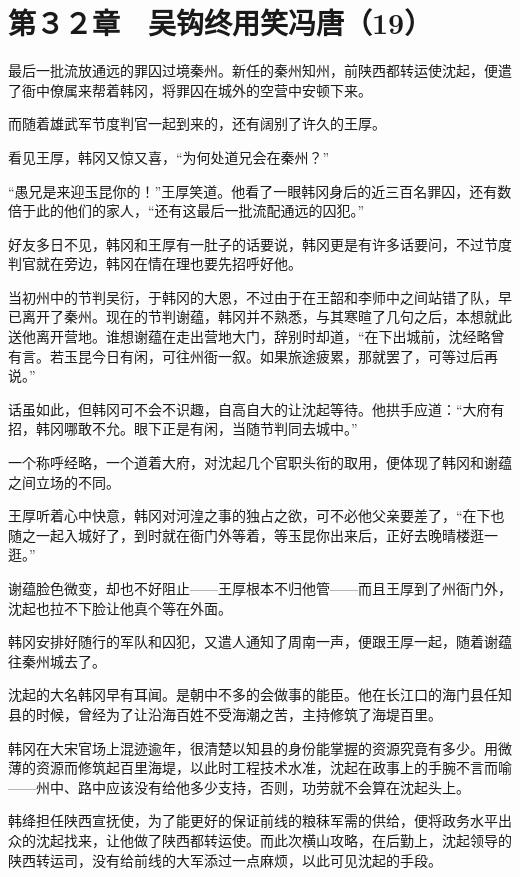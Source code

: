 \section{第３２章　吴钩终用笑冯唐（19）}

最后一批流放通远的罪囚过境秦州。新任的秦州知州，前陕西都转运使沈起，便遣了衙中僚属来帮着韩冈，将罪囚在城外的空营中安顿下来。

而随着雄武军节度判官一起到来的，还有阔别了许久的王厚。

看见王厚，韩冈又惊又喜，“为何处道兄会在秦州？”

“愚兄是来迎玉昆你的！”王厚笑道。他看了一眼韩冈身后的近三百名罪囚，还有数倍于此的他们的家人，“还有这最后一批流配通远的囚犯。”

好友多日不见，韩冈和王厚有一肚子的话要说，韩冈更是有许多话要问，不过节度判官就在旁边，韩冈在情在理也要先招呼好他。

当初州中的节判吴衍，于韩冈的大恩，不过由于在王韶和李师中之间站错了队，早已离开了秦州。现在的节判谢蕴，韩冈并不熟悉，与其寒暄了几句之后，本想就此送他离开营地。谁想谢蕴在走出营地大门，辞别时却道，“在下出城前，沈经略曾有言。若玉昆今日有闲，可往州衙一叙。如果旅途疲累，那就罢了，可等过后再说。”

话虽如此，但韩冈可不会不识趣，自高自大的让沈起等待。他拱手应道：“大府有招，韩冈哪敢不允。眼下正是有闲，当随节判同去城中。”

一个称呼经略，一个道着大府，对沈起几个官职头衔的取用，便体现了韩冈和谢蕴之间立场的不同。

王厚听着心中快意，韩冈对河湟之事的独占之欲，可不必他父亲要差了，“在下也随之一起入城好了，到时就在衙门外等着，等玉昆你出来后，正好去晚晴楼逛一逛。”

谢蕴脸色微变，却也不好阻止——王厚根本不归他管——而且王厚到了州衙门外，沈起也拉不下脸让他真个等在外面。

韩冈安排好随行的军队和囚犯，又遣人通知了周南一声，便跟王厚一起，随着谢蕴往秦州城去了。

沈起的大名韩冈早有耳闻。是朝中不多的会做事的能臣。他在长江口的海门县任知县的时候，曾经为了让沿海百姓不受海潮之苦，主持修筑了海堤百里。

韩冈在大宋官场上混迹逾年，很清楚以知县的身份能掌握的资源究竟有多少。用微薄的资源而修筑起百里海堤，以此时工程技术水准，沈起在政事上的手腕不言而喻——州中、路中应该没有给他多少支持，否则，功劳就不会算在沈起头上。

韩绛担任陕西宣抚使，为了能更好的保证前线的粮秣军需的供给，便将政务水平出众的沈起找来，让他做了陕西都转运使。而此次横山攻略，在后勤上，沈起领导的陕西转运司，没有给前线的大军添过一点麻烦，以此可见沈起的手段。

